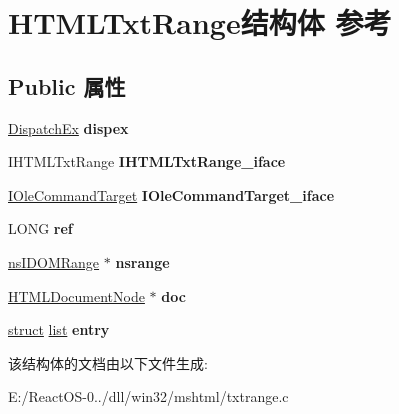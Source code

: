 \hypertarget{struct_h_t_m_l_txt_range}{}\section{H\+T\+M\+L\+Txt\+Range结构体 参考}
\label{struct_h_t_m_l_txt_range}
\subsection*{Public 属性}
\begin{DoxyCompactItemize}
\item 
\mbox{\label{struct_h_t_m_l_txt_range_a77e9b84826eeba9cd6104173a576d957}} 
\hyperlink{struct_dispatch_ex}{Dispatch\+Ex} {\bfseries dispex}
\item 
\mbox{\label{struct_h_t_m_l_txt_range_aaa68e7da56033bfcb7b3b628a4d6c90c}} 
I\+H\+T\+M\+L\+Txt\+Range {\bfseries I\+H\+T\+M\+L\+Txt\+Range\+\_\+iface}
\item 
\mbox{\label{struct_h_t_m_l_txt_range_a07d22de7b84276c674f6b1a1ce5f39fb}} 
\hyperlink{interface_i_ole_command_target}{I\+Ole\+Command\+Target} {\bfseries I\+Ole\+Command\+Target\+\_\+iface}
\item 
\mbox{\label{struct_h_t_m_l_txt_range_a287eb3d6c05292cff5e016eeb14439bf}} 
L\+O\+NG {\bfseries ref}
\item 
\mbox{\label{struct_h_t_m_l_txt_range_ad7eb31a1f376220e42b7567f8de6fd72}} 
\hyperlink{interfacens_i_d_o_m_range}{ns\+I\+D\+O\+M\+Range} $\ast$ {\bfseries nsrange}
\item 
\mbox{\label{struct_h_t_m_l_txt_range_a22b03e98d929af67afc786c55120d376}} 
\hyperlink{struct_h_t_m_l_document_node}{H\+T\+M\+L\+Document\+Node} $\ast$ {\bfseries doc}
\item 
\mbox{\label{struct_h_t_m_l_txt_range_a0dfe3c5d88f94d6e986ed32e6ed90420}} 
\hyperlink{interfacestruct}{struct} \hyperlink{classlist}{list} {\bfseries entry}
\end{DoxyCompactItemize}


该结构体的文档由以下文件生成\+:\begin{DoxyCompactItemize}
\item 
E\+:/\+React\+O\+S-\/0../dll/win32/mshtml/txtrange.\+c\end{DoxyCompactItemize}
